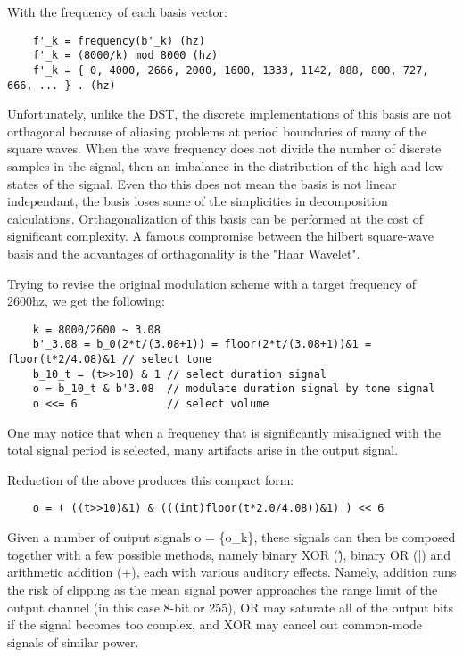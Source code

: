 \documentclass[11pt]{book}
\begin{document}
With the frequency of each basis vector:

\begin{verbatim}
	f'_k = frequency(b'_k) (hz)
	f'_k = (8000/k) mod 8000 (hz)
	f'_k = { 0, 4000, 2666, 2000, 1600, 1333, 1142, 888, 800, 727, 666, ... } . (hz)
\end{verbatim}

Unfortunately, unlike the DST, the discrete implementations of this basis are not orthagonal because of aliasing problems at period boundaries
of many of the square waves.  When the wave frequency does not divide the number of discrete samples in the signal, then an imbalance in the
distribution of the high and low states of the signal. Even tho this does not mean the basis is not linear independant, the basis loses some of
the simplicities in decomposition calculations. Orthagonalization of this basis can be performed at the cost of significant complexity. A famous
compromise between the hilbert square-wave basis and the advantages of orthagonality is the "Haar Wavelet".

Trying to revise the original modulation scheme with a target frequency of 2600hz, we get the following:

\begin{verbatim}
	k = 8000/2600 ~ 3.08
	b'_3.08 = b_0(2*t/(3.08+1)) = floor(2*t/(3.08+1))&1 = floor(t*2/4.08)&1 // select tone
	b_10_t = (t>>10) & 1 // select duration signal
	o = b_10_t & b'3.08  // modulate duration signal by tone signal
	o <<= 6              // select volume
\end{verbatim}

One may notice that when a frequency that is significantly misaligned with the total signal period is selected, many artifacts arise
in the output signal.

Reduction of the above produces this compact form:

\begin{verbatim}
	o = ( ((t>>10)&1) & (((int)floor(t*2.0/4.08))&1) ) << 6
\end{verbatim}

Given a number of output signals o = \{o\_k\}, these signals can then be composed together with a few possible
methods, namely binary XOR (\^), binary OR (|) and arithmetic addition (+), each with various auditory effects.
Namely, addition runs the risk of clipping as the mean signal power approaches the range limit of the output
channel (in this case 8-bit or 255), OR may saturate all of the output bits if the signal becomes too complex,
and XOR may cancel out common-mode signals of similar power.
\end{document}
